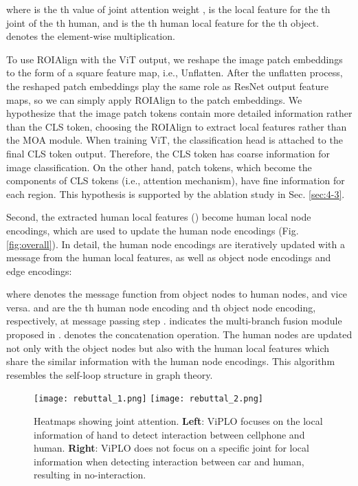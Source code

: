 \documentclass[10pt,twocolumn,letterpaper]{article}
\begin{document}
where  is the th value of joint attention weight ,  is the local feature for the th joint of the th human, and  is the th human local feature for the th object.  denotes the element-wise multiplication.

To use ROIAlign with the ViT output, we reshape the image patch embeddings to the form of a square feature map, i.e., Unflatten. After the unflatten process, the reshaped patch embeddings play the same role as ResNet output feature maps, so we can simply apply ROIAlign to the patch embeddings. We hypothesize that the image patch tokens contain more detailed information rather than the CLS token, choosing the ROIAlign to extract local features rather than the MOA module. When training ViT, the classification head is attached to the final CLS token output. Therefore, the CLS token has coarse information for image classification. On the other hand, patch tokens, which become the components of CLS tokens (i.e., attention mechanism), have fine information for each region. This hypothesis is supported by the ablation study in Sec. \ref{sec:4-3}.


Second, the extracted human local features () become human local node encodings, which are used to update the human node encodings (Fig. \ref{fig:overall}). In detail, the human node encodings are iteratively updated with a message from the human local features, as well as object node encodings and edge encodings:


where  denotes the message function from object nodes to human nodes, and vice versa.  and  are the th human node encoding and  th object node encoding, respectively, at message passing step .  indicates the multi-branch fusion module proposed in \cite{zhang2021spatially}.  denotes the concatenation operation. The human nodes are updated not only with the object nodes but also with the human local features which share the similar information with the human node encodings. This algorithm resembles the self-loop structure in graph theory.

\begin{figure}[t]
\begin{center}

\texttt{[image: rebuttal\_1.png]}
\texttt{[image: rebuttal\_2.png]}

\end{center}
\vspace{-5mm}
  \caption{Heatmaps showing joint attention. \textbf{Left}: ViPLO focuses on the local information of hand to detect interaction between cellphone and human. \textbf{Right}:  ViPLO does not focus on a specific joint for local information when detecting interaction between car and human, resulting in no-interaction.}
\vspace{-1mm}
\label{fig:qualitative}
\end{figure} 
\end{document}
